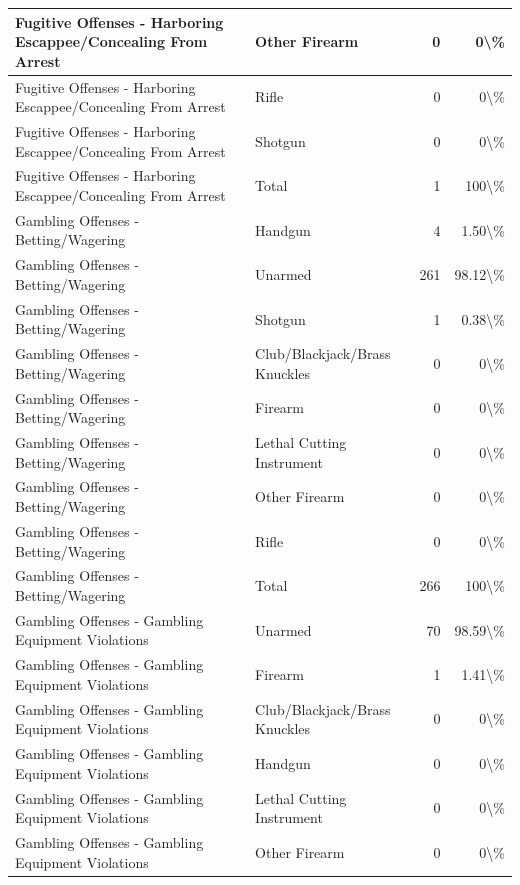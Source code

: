 \documentclass[
]{krantz}
\begin{document}
\begin{longtable}[t]{l|l|r|r}
\hline
Fugitive Offenses - Harboring Escappee/Concealing From Arrest & Other Firearm & 0 & 0\textbackslash{}\%\\
\hline
Fugitive Offenses - Harboring Escappee/Concealing From Arrest & Rifle & 0 & 0\textbackslash{}\%\\
\hline
Fugitive Offenses - Harboring Escappee/Concealing From Arrest & Shotgun & 0 & 0\textbackslash{}\%\\
\hline
Fugitive Offenses - Harboring Escappee/Concealing From Arrest & Total & 1 & 100\textbackslash{}\%\\
\hline
Gambling Offenses - Betting/Wagering & Handgun & 4 & 1.50\textbackslash{}\%\\
\hline
Gambling Offenses - Betting/Wagering & Unarmed & 261 & 98.12\textbackslash{}\%\\
\hline
Gambling Offenses - Betting/Wagering & Shotgun & 1 & 0.38\textbackslash{}\%\\
\hline
Gambling Offenses - Betting/Wagering & Club/Blackjack/Brass Knuckles & 0 & 0\textbackslash{}\%\\
\hline
Gambling Offenses - Betting/Wagering & Firearm & 0 & 0\textbackslash{}\%\\
\hline
Gambling Offenses - Betting/Wagering & Lethal Cutting Instrument & 0 & 0\textbackslash{}\%\\
\hline
Gambling Offenses - Betting/Wagering & Other Firearm & 0 & 0\textbackslash{}\%\\
\hline
Gambling Offenses - Betting/Wagering & Rifle & 0 & 0\textbackslash{}\%\\
\hline
Gambling Offenses - Betting/Wagering & Total & 266 & 100\textbackslash{}\%\\
\hline
Gambling Offenses - Gambling Equipment Violations & Unarmed & 70 & 98.59\textbackslash{}\%\\
\hline
Gambling Offenses - Gambling Equipment Violations & Firearm & 1 & 1.41\textbackslash{}\%\\
\hline
Gambling Offenses - Gambling Equipment Violations & Club/Blackjack/Brass Knuckles & 0 & 0\textbackslash{}\%\\
\hline
Gambling Offenses - Gambling Equipment Violations & Handgun & 0 & 0\textbackslash{}\%\\
\hline
Gambling Offenses - Gambling Equipment Violations & Lethal Cutting Instrument & 0 & 0\textbackslash{}\%\\
\hline
Gambling Offenses - Gambling Equipment Violations & Other Firearm & 0 & 0\textbackslash{}\%\\

\end{longtable}
\end{document}
